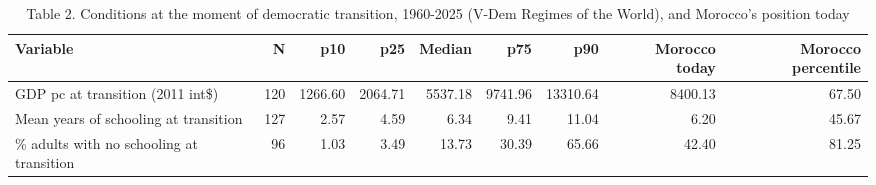 \begin{table}
\caption{Table 2. Conditions at the moment of democratic transition, 1960-2025 (V-Dem Regimes of the World), and Morocco's position today}
\label{tab:T2_transition_distribution}
\begin{tabular}{lrrrrrrrr}
\toprule
Variable & N & p10 & p25 & Median & p75 & p90 & Morocco today & Morocco percentile \\
\midrule
GDP pc at transition (2011 int\$) & 120 & 1266.60 & 2064.71 & 5537.18 & 9741.96 & 13310.64 & 8400.13 & 67.50 \\
Mean years of schooling at transition & 127 & 2.57 & 4.59 & 6.34 & 9.41 & 11.04 & 6.20 & 45.67 \\
\% adults with no schooling at transition & 96 & 1.03 & 3.49 & 13.73 & 30.39 & 65.66 & 42.40 & 81.25 \\
\bottomrule
\end{tabular}
\end{table}
